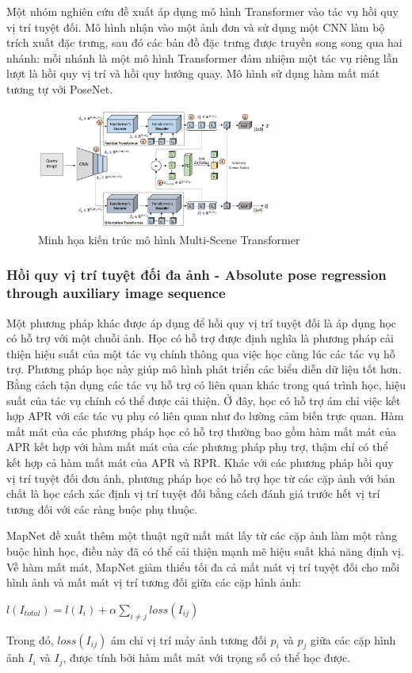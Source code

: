 Một nhóm nghiên cứu \cite{shavit2021learning, shavit2023coarse} đề xuất áp dụng mô hình Transformer vào tác vụ hồi quy vị trí tuyệt đối. Mô hình nhận vào một ảnh đơn và sử dụng một CNN làm bộ trích xuất đặc trưng, sau đó các bản đồ đặc trưng được truyền song song qua hai nhánh: mỗi nhánh là một mô hình Transformer đảm nhiệm một tác vụ riêng lần lượt là hồi quy vị trí và hồi quy hướng quay. Mô hình sử dụng hàm mất mát tương tự với PoseNet.
\begin{figure}[H]
    \centering
    \includegraphics[width=0.7\textwidth]{pics/Chapter2/trans.png}
    \caption{Minh họa kiến trúc mô hình Multi-Scene Transformer \cite{shavit2021learning, shavit2023coarse}}
\end{figure}

\subsubsection*{Hồi quy vị trí tuyệt đối đa ảnh - Absolute pose regression through auxiliary image sequence}
Một phương pháp khác được áp dụng để hồi quy vị trí tuyệt đối là áp dụng học có hỗ trợ với một chuỗi ảnh. Học có hỗ trợ được định nghĩa là phương pháp cải thiện hiệu suất của một tác vụ chính thông qua việc học cùng lúc các tác vụ hỗ trợ. Phương pháp học này giúp mô hình phát triển các biểu diễn dữ liệu tốt hơn. Bằng cách tận dụng các tác vụ hỗ trợ có liên quan khác trong quá trình học, hiệu suất của tác vụ chính có thể được cải thiện. Ở đây, học có hỗ trợ ám chỉ việc kết hợp APR với các tác vụ phụ có liên quan như đo lường cảm biến trực quan. Hàm mất mát của các phương pháp học có hỗ trợ thường bao gồm hàm mất mát của APR kết hợp với hàm mất mát của các phương pháp phụ trợ, thậm chí có thể kết hợp cả hàm mất mát của APR và RPR. Khác với các phương pháp hồi quy vị trí tuyệt đối đơn ảnh, phương pháp học có hỗ trợ học từ các cặp ảnh với bản chất là học cách xác định vị trí tuyệt đối bằng cách đánh giá trước hết vị trí tương đối với các ràng buộc phụ thuộc.

MapNet \cite{brahmbhatt2018geometryaware} đề xuất thêm một thuật ngữ mất mát lấy từ các cặp ảnh làm một ràng buộc hình học, điều này đã có thể cải thiện mạnh mẽ hiệu suất khả năng định vị. Về hàm mất mát, MapNet giảm thiểu tối đa cả mất mát vị trí tuyệt đối cho mỗi hình ảnh và mất mát vị trí tương đối giữa các cặp hình ảnh:
\begin{center}
    $l(I_{total}) = l(I_i) + \alpha\sum_{i\neq j}loss(I_{ij} )$
\end{center}
Trong đó, $loss(I_{ij} )$ ám chỉ vị trí máy ảnh tương đối $p_i$ và $p_j$ giữa các cặp hình ảnh $I_i$ và $I_j$, được tính bởi hàm mất mát với trọng số có thể học được.

